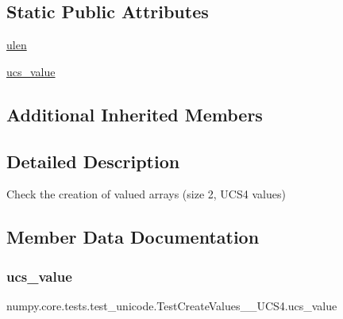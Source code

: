 \subsection*{Static Public Attributes}
\begin{DoxyCompactItemize}
\item 
\hyperlink{classnumpy_1_1core_1_1tests_1_1test__unicode_1_1TestCreateValues__2__UCS4_a45d113d6cac8018be913df95500b2ef0}{ulen}
\item 
\hyperlink{classnumpy_1_1core_1_1tests_1_1test__unicode_1_1TestCreateValues__2__UCS4_a77ed8a2961286351008640d71e9c315b}{ucs\+\_\+value}
\end{DoxyCompactItemize}
\subsection*{Additional Inherited Members}


\subsection{Detailed Description}
\begin{DoxyVerb}Check the creation of valued arrays (size 2, UCS4 values)\end{DoxyVerb}
 

\subsection{Member Data Documentation}
\mbox{\label{classnumpy_1_1core_1_1tests_1_1test__unicode_1_1TestCreateValues__2__UCS4_a77ed8a2961286351008640d71e9c315b}} 
\subsubsection{\texorpdfstring{ucs\+\_\+value}{ucs\_value}}
{\footnotesize\ttfamily numpy.\+core.\+tests.\+test\+\_\+unicode.\+Test\+Create\+Values\+\_\+\_\+\+U\+C\+S4.\+ucs\+\_\+value\hspace{0.3cm}{\ttfamily [static]}}

